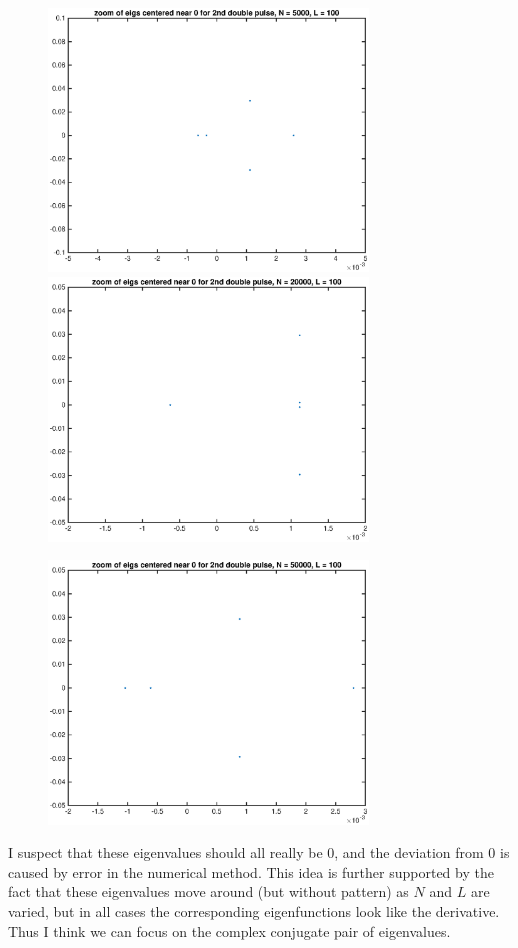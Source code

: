 \documentclass[12pt]{article}
\begin{document}
\begin{figure}[H]
\includegraphics[width=8.5cm]{eigs1zoom2.eps}
\includegraphics[width=8.5cm]{eigs1zoom3.eps}
\end{figure}
\begin{figure}[H]
\includegraphics[width=8.5cm]{eigs1zoom4.eps}
\end{figure}

I suspect that these eigenvalues should all really be 0, and the deviation from 0 is caused by error in the numerical method. This idea is further supported by the fact that these eigenvalues move around (but without pattern) as $N$ and $L$ are varied, but in all cases the corresponding eigenfunctions look like the derivative. Thus I think we can focus on the complex conjugate pair of eigenvalues.\\
\end{document}
